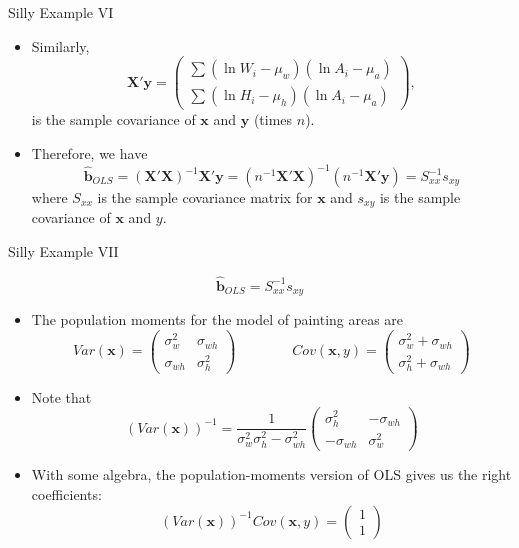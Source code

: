 \documentclass[english,xcolor={dvipsnames},aspectratio=169]{beamer}
\begin{document}
\begin{frame}{Silly Example VI}

	\begin{itemize}
	\item Similarly,
\[
\boldsymbol{X'}\boldsymbol{y}=\left(\begin{array}{c}
\sum\left(\ln W_{i}-\mu_{w}\right)\left(\ln A_{i}-\mu_{a}\right)\\
\sum\left(\ln H_{i}-\mu_{h}\right)\left(\ln A_{i}-\mu_{a}\right)
\end{array}\right),
\]
is the sample covariance of $\boldsymbol{x}$ and $\boldsymbol{y}$
(times $n$). 

\smallskip
\item Therefore, we have
\[
\widehat{\boldsymbol{b}}_{OLS}=\left(\boldsymbol{X}'\boldsymbol{X}\right)^{-1}\boldsymbol{X}'\boldsymbol{y}=\left(n^{-1}\boldsymbol{X}'\boldsymbol{X}\right)^{-1}\left(n^{-1}\boldsymbol{X}'\boldsymbol{y}\right)=S_{xx}^{-1}s_{xy}
\]
where $S_{xx}$ is the sample covariance matrix for $\boldsymbol{x}$
and $s_{xy}$ is the sample covariance of $\boldsymbol{x}$ and $y$. 

\end{itemize}
\end{frame}


\begin{frame}{Silly Example VII}

\[
\widehat{\boldsymbol{b}}_{OLS}=S_{xx}^{-1}s_{xy}
\]

\begin{itemize}
	\item The population moments for the model of painting areas are \[
Var\left(\boldsymbol{x}\right)=\left(\begin{array}{cc}
\sigma_{w}^{2} & \sigma_{wh}\\
\sigma_{wh} & \sigma_{h}^{2}
\end{array}\right)\qquad\qquad Cov\left(\boldsymbol{x},y\right)=\left(\begin{array}{c}
\sigma_{w}^{2}+\sigma_{wh}\\
\sigma_{h}^{2}+\sigma_{wh}
\end{array}\right)
\]

\item Note that 
\[
\left(Var\left(\boldsymbol{x}\right)\right)^{-1}=\frac{1}{\sigma_{w}^{2}\sigma_{h}^{2}-\sigma_{wh}^{2}}\left(\begin{array}{cc}
\sigma_{h}^{2} & -\sigma_{wh}\\
-\sigma_{wh} & \sigma_{w}^{2}
\end{array}\right)
\]

\item With some algebra, the population-moments version of OLS gives us the right coefficients:
\[
\left(Var\left(\boldsymbol{x}\right)\right)^{-1}Cov\left(\boldsymbol{x},y\right)=\left(\begin{array}{c}
1\\
1
\end{array}\right)
\]
\end{itemize}
\end{frame}
\end{document}
